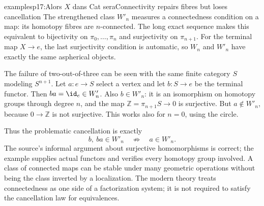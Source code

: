\begin{dcomment}{examples}{p17:Alors $X$ dans Cat sera}{Connectivity repairs fibres but loses cancellation}
The strengthened class \(W'_n\) measures a connectedness condition on a map: its homotopy fibres are \(n\)-connected. The long exact sequence makes this equivalent to bijectivity on \(\pi_0,\ldots,\pi_n\) and surjectivity on \(\pi_{n+1}\). For the terminal map \(X\to e\), the last surjectivity condition is automatic, so \(W_n\) and \(W'_n\) have exactly the same aspherical objects.

The failure of two-out-of-three can be seen with the same finite category \(S\) modeling \(S^{n+1}\). Let \(a:e\to S\) select a vertex and let \(b:S\to e\) be the terminal functor. Then \(ba=\id_e\in W'_n\). Also \(b\in W'_n\): it is an isomorphism on homotopy groups through degree \(n\), and the map \(\mathbb Z=\pi_{n+1}S\to0\) is surjective. But \(a\notin W'_n\), because \(0\to\mathbb Z\) is not surjective. This works also for \(n=0\), using the circle.

Thus the problematic cancellation is exactly
\[
 b,\ ba\in W'_n\quad\nRightarrow\quad a\in W'_n.
\]
The source's informal argument about surjective homomorphisms is correct; the example supplies actual functors and verifies every homotopy group involved. A class of connected maps can be stable under many geometric operations without being the class inverted by a localization. The modern theory treats connectedness as one side of a factorization system; it is not required to satisfy the cancellation law for equivalences.
\end{dcomment}


